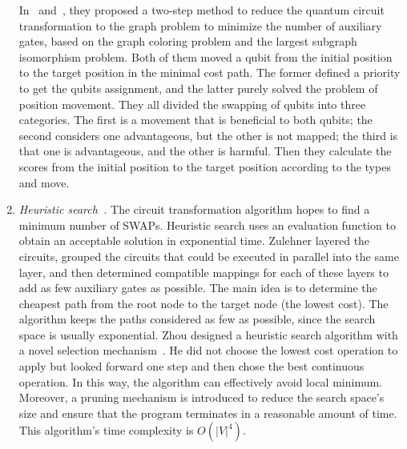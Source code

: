 \documentclass[runningheads]{llncs}
\begin{document}
\begin{enumerate}[1)]
	In~\cite{Guerreschi2018} and~\cite{Matsuo2019}, they proposed a two-step method to reduce the quantum circuit transformation to the graph problem to minimize the number of auxiliary gates, based on the graph coloring problem and the largest subgraph isomorphism problem. Both of them moved a qubit from the initial position to the target position in the minimal cost path. The former defined a priority to get the qubits assignment, and the latter purely solved the problem of position movement. They all divided the swapping of qubits into three categories. The first is a movement that is beneficial to both qubits; the second considers one advantageous, but the other is not mapped; the third is that one is advantageous, and the other is harmful. Then they calculate the scores from the initial position to the target position according to the types and move.
	\item \emph{Heuristic search~\cite{Zulehner2017,Cowtan2019,Li2018,Xiangzhen2020,2018QubitSiraichi}.}
	The circuit transformation algorithm hopes to find a minimum number of SWAPs. Heuristic search uses an evaluation function to obtain an acceptable solution in exponential time. Zulehner layered the circuits, grouped the circuits that could be executed in parallel into the same layer, and then determined compatible mappings for each of these layers to add as few auxiliary gates as possible. The main idea is to determine the cheapest path from the root node to the target node (the lowest cost). The algorithm keeps the paths considered as few as possible, since the search space is usually exponential. Zhou designed a heuristic search algorithm with a novel selection mechanism~\cite{Xiangzhen2020}. He did not choose the lowest cost operation to apply but looked forward one step and then chose the best continuous operation. In this way, the algorithm can effectively avoid local minimum. Moreover, a pruning mechanism is introduced to reduce the search space's size and ensure that the program terminates in a reasonable amount of time. This algorithm's time complexity is $O(|V|^{4})$.


\end{enumerate}
\end{document}
